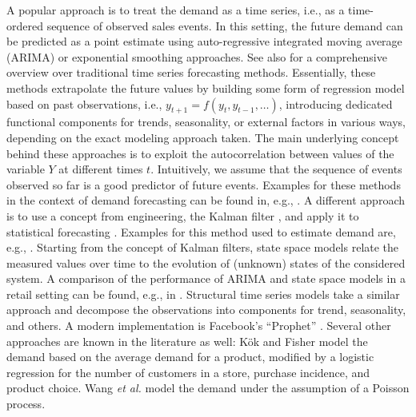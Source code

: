 \documentclass[BCOR=1mm, DIV=calc,10pt,
twoside=true,
twocolumn,
headings=normal]{scrartcl}
\newcommand{\etal}{ {\em et al.}}
\begin{document}
A popular approach is to treat the demand as a time series, i.e., as a time-ordered sequence of observed sales events. In this setting, the future demand can be predicted as a point estimate using auto-regressive integrated moving average (ARIMA) \cite{BoxJenkins} or exponential smoothing \cite{croston1972forecasting, holt1957forecasting, Brown1963, Gardner1985} approaches. See also \cite{deGooijerHyndman2006} for a comprehensive overview over traditional time series forecasting methods. Essentially, these methods extrapolate the future values by building some form of regression model based on past observations, i.e., $y_{t+1} = f(y_t, y_{t-1}, \ldots)$, introducing dedicated functional components for trends, seasonality, or external factors in various ways, depending on the exact modeling approach taken. The main underlying concept behind these approaches is to exploit the autocorrelation between values of the variable $Y$ at different times $t$. Intuitively, we assume that  the sequence of events observed so far is a good predictor of future events. Examples for these methods in the context of demand forecasting can be found in, e.g., \cite{huber2017cluster, kalchschmidt2006forecasting, fattah2018forecasting, permatasari2018sales}.  A different approach is to use a concept from engineering, the Kalman filter \cite{kalman1960new}, and apply it to statistical forecasting \cite{morrison1977kalman}. Examples for this method used to estimate demand are, e.g., \cite{mitropoulos1980using, tegene1991kalman, kandananond2014applying,jacobi2007water}. Starting from the concept of Kalman filters, state space models \cite{hyndman2008forecasting} relate the measured values over time to the evolution of (unknown) states of the considered system. A comparison of the performance of ARIMA and state space models in a retail setting can be found, e.g., in \cite{ramos2015performance}. Structural time series models \cite{StructuralTS} take a similar approach and decompose the observations into components for trend, seasonality, and others. A modern implementation is Facebook's ``Prophet''  \cite{taylor2018forecasting}. Several other approaches are known in the literature as well: K\"ok and Fisher \cite{kok2007demand} model the demand based on the average demand for a product, modified by a logistic regression for the number of customers in a store, purchase incidence, and product choice. Wang \etal \cite{wang2005demand} model the demand under the assumption of a Poisson process.
\end{document}
